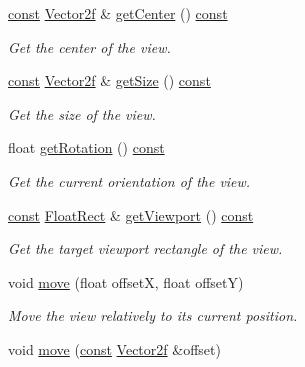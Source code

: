 \begin{DoxyCompactItemize}
\hyperlink{term__entry_8h_a57bd63ce7f9a353488880e3de6692d5a}{const} \hyperlink{namespacesf_a80cea3c46537294fd1d8d428566ad8b2}{Vector2f} \& \hyperlink{classsf_1_1_view_adae81dede405b91bb3c487e28f536fe9}{get\-Center} () \hyperlink{term__entry_8h_a57bd63ce7f9a353488880e3de6692d5a}{const} 
\begin{DoxyCompactList}\small\item\em Get the center of the view. \end{DoxyCompactList}\item 
\hyperlink{term__entry_8h_a57bd63ce7f9a353488880e3de6692d5a}{const} \hyperlink{namespacesf_a80cea3c46537294fd1d8d428566ad8b2}{Vector2f} \& \hyperlink{classsf_1_1_view_aa130cf34676d715242bee661537a6257}{get\-Size} () \hyperlink{term__entry_8h_a57bd63ce7f9a353488880e3de6692d5a}{const} 
\begin{DoxyCompactList}\small\item\em Get the size of the view. \end{DoxyCompactList}\item 
float \hyperlink{classsf_1_1_view_a8ad320469a27f96f6f49de1c14f0978d}{get\-Rotation} () \hyperlink{term__entry_8h_a57bd63ce7f9a353488880e3de6692d5a}{const} 
\begin{DoxyCompactList}\small\item\em Get the current orientation of the view. \end{DoxyCompactList}\item 
\hyperlink{term__entry_8h_a57bd63ce7f9a353488880e3de6692d5a}{const} \hyperlink{namespacesf_ab0d978f5903922a6bdfca1736b71ccc9}{Float\-Rect} \& \hyperlink{classsf_1_1_view_af1db1e4f21d104a9691fd38be9165758}{get\-Viewport} () \hyperlink{term__entry_8h_a57bd63ce7f9a353488880e3de6692d5a}{const} 
\begin{DoxyCompactList}\small\item\em Get the target viewport rectangle of the view. \end{DoxyCompactList}\item 
void \hyperlink{classsf_1_1_view_a0c82144b837caf812f7cb25a43d80c41}{move} (float offset\-X, float offset\-Y)
\begin{DoxyCompactList}\small\item\em Move the view relatively to its current position. \end{DoxyCompactList}\item 
void \hyperlink{classsf_1_1_view_a4c98a6e04fed756dfaff8f629de50862}{move} (\hyperlink{term__entry_8h_a57bd63ce7f9a353488880e3de6692d5a}{const} \hyperlink{namespacesf_a80cea3c46537294fd1d8d428566ad8b2}{Vector2f} \&offset)

\end{DoxyCompactItemize}
